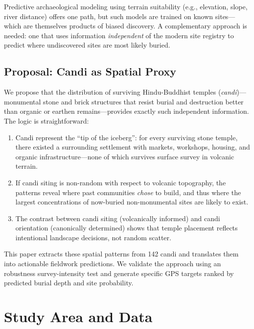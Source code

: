 \documentclass[12pt,a4paper]{article}
\begin{document}
Predictive archaeological modeling using terrain suitability (e.g., elevation, slope, river distance) offers one path, but such models are trained on known sites---which are themselves products of biased discovery. A complementary approach is needed: one that uses information \emph{independent} of the modern site registry to predict where undiscovered sites are most likely buried.

\subsection{Proposal: Candi as Spatial Proxy}

We propose that the distribution of surviving Hindu-Buddhist temples (\emph{candi})---monumental stone and brick structures that resist burial and destruction better than organic or earthen remains---provides exactly such independent information. The logic is straightforward:

\begin{enumerate}
    \item Candi represent the ``tip of the iceberg'': for every surviving stone temple, there existed a surrounding settlement with markets, workshops, housing, and organic infrastructure---none of which survives surface survey in volcanic terrain.
    \item If candi siting is non-random with respect to volcanic topography, the patterns reveal where past communities \emph{chose} to build, and thus where the largest concentrations of now-buried non-monumental sites are likely to exist.
    \item The contrast between candi siting (volcanically informed) and candi orientation (canonically determined) shows that temple placement reflects intentional landscape decisions, not random scatter.
\end{enumerate}

This paper extracts these spatial patterns from 142 candi and translates them into actionable fieldwork predictions. We validate the approach using an robustness survey-intensity test and generate specific GPS targets ranked by predicted burial depth and site probability.

\section{Study Area and Data}
\end{document}
